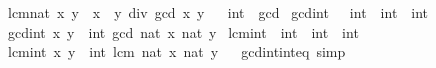 \begin{isabellebody}
\ \ \ {\isachardoublequoteopen}lcm{\isacharunderscore}{\kern0pt}nat\ x\ y\ {\isacharequal}{\kern0pt}\ x\ {\isacharasterisk}{\kern0pt}\ y\ div\ {\isacharparenleft}{\kern0pt}gcd\ x\ y{\isacharparenright}{\kern0pt}{\isachardoublequoteclose}\isanewline
\isanewline
{}\isamarkupfalse%
%
\isadelimproof
\ %
\endisadelimproof
%
\isatagproof
\isacommand{{\isachardot}{\kern0pt}{\isachardot}{\kern0pt}}\isamarkupfalse%
%
\endisatagproof
{\isafoldproof}%
%
\isadelimproof
%
\endisadelimproof
\isanewline
\isanewline
{}\isamarkupfalse%
\isanewline
\isanewline
{}\isamarkupfalse%
\ int\ {\isacharcolon}{\kern0pt}{\isacharcolon}{\kern0pt}\ gcd\isanewline
{}\isanewline
\isanewline
{}\isamarkupfalse%
\ gcd{\isacharunderscore}{\kern0pt}int\ \ {\isacharcolon}{\kern0pt}{\isacharcolon}{\kern0pt}\ {\isachardoublequoteopen}int\ {\isasymRightarrow}\ int\ {\isasymRightarrow}\ int{\isachardoublequoteclose}\isanewline
\ \ \ {\isachardoublequoteopen}gcd{\isacharunderscore}{\kern0pt}int\ x\ y\ {\isacharequal}{\kern0pt}\ int\ {\isacharparenleft}{\kern0pt}gcd\ {\isacharparenleft}{\kern0pt}nat\ {\isasymbar}x{\isasymbar}{\isacharparenright}{\kern0pt}\ {\isacharparenleft}{\kern0pt}nat\ {\isasymbar}y{\isasymbar}{\isacharparenright}{\kern0pt}{\isacharparenright}{\kern0pt}{\isachardoublequoteclose}\isanewline
\isanewline
{}\isamarkupfalse%
\ lcm{\isacharunderscore}{\kern0pt}int\ {\isacharcolon}{\kern0pt}{\isacharcolon}{\kern0pt}\ {\isachardoublequoteopen}int\ {\isasymRightarrow}\ int\ {\isasymRightarrow}\ int{\isachardoublequoteclose}\isanewline
\ \ \ {\isachardoublequoteopen}lcm{\isacharunderscore}{\kern0pt}int\ x\ y\ {\isacharequal}{\kern0pt}\ int\ {\isacharparenleft}{\kern0pt}lcm\ {\isacharparenleft}{\kern0pt}nat\ {\isasymbar}x{\isasymbar}{\isacharparenright}{\kern0pt}\ {\isacharparenleft}{\kern0pt}nat\ {\isasymbar}y{\isasymbar}{\isacharparenright}{\kern0pt}{\isacharparenright}{\kern0pt}{\isachardoublequoteclose}\isanewline
\isanewline
{}\isamarkupfalse%
%
\isadelimproof
\ %
\endisadelimproof
%
\isatagproof
\isacommand{{\isachardot}{\kern0pt}{\isachardot}{\kern0pt}}\isamarkupfalse%
%
\endisatagproof
{\isafoldproof}%
%
\isadelimproof
%
\endisadelimproof
\isanewline
\isanewline
{}\isamarkupfalse%
\isanewline
\isanewline
{}\isamarkupfalse%
\ gcd{\isacharunderscore}{\kern0pt}int{\isacharunderscore}{\kern0pt}int{\isacharunderscore}{\kern0pt}eq\ {\isacharbrackleft}{\kern0pt}simp{\isacharbrackright}{\kern0pt}{\isacharcolon}{\kern0pt}\isanewline

\end{isabellebody}
